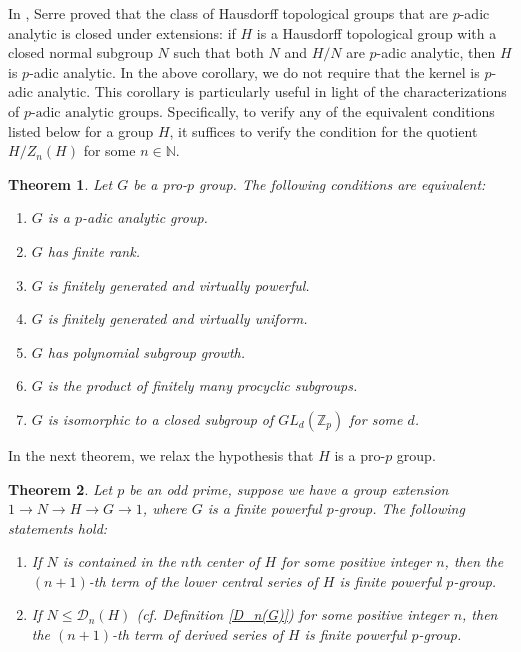 \documentclass[12pt]{elsarticle}
\makeatletter
\newtheorem{theorem}{Theorem}[section]
\newtheorem*{main corollary*}{Main Corollary}
\theoremstyle{definition}
\newcommand{\settheoremtag}[1]{%
  \let\oldthetheorem\thetheorem%
  \renewcommand{\thetheorem}{#1}%
  \g@addto@macro\endtheorem{%
    \global\let\thetheorem\oldthetheorem}%
  }
\makeatother
\begin{document}
In \cite[Theorem 3.4.5]{La1965}, Serre proved that the class of Hausdorff topological groups that are $p$-adic analytic is closed under extensions: if $H$ is a Hausdorff topological group with a closed normal subgroup $N$ such that both $N$ and $H/N$ are $p$-adic analytic, then $H$ is $p$-adic analytic. In the above corollary, we do not require that the kernel is $p$-adic analytic. This corollary is particularly useful in light of the characterizations of ${p\text{-adic analytic groups}}$. Specifically, to verify any of the equivalent conditions listed below for a group $H$, it suffices to verify the condition for the quotient $H/Z_n(H)$ for some $n \in \mathbb{N}$.

\settheoremtag{1.1}
\begin{theorem}\cite[Interlude A, 1]{DDMS99} \label{padic analytic characterization}
    Let $G$ be a pro-$p$ group. The following conditions are equivalent:
\begin{enumerate}
    \item [(i)] $G$ is a $p$-adic analytic group.
    \item [(ii)] $G$ has finite rank.
    \item [(iii)] $G$ is finitely generated and virtually powerful.
    \item [(iv)] $G$ is finitely generated and virtually uniform.
    \item [(v)] $G$ has polynomial subgroup growth.
    \item [(vi)] $G$ is the product of finitely many procyclic subgroups.
    \item [(vii)] $G$ is isomorphic to a closed subgroup of $GL_d(\mathbb{Z}_p)$ for some $d$.
\end{enumerate}
\end{theorem}


 

In the next theorem, we relax the hypothesis that $H$ is a pro-$p$ group.


\settheoremtag{B}
\begin{theorem} \label{MR: extension of powerful implies lower central and derived are powerful}
    Let $p$ be an odd prime, suppose we have a group extension $1\to N\to H \to G\to 1$, where $G$ is a finite powerful $p$-group. The following statements hold:
    
    \begin{enumerate}
        \item [(i)] If $N$ is contained in the $n$th center of $H$ for some positive integer $n$, then the $(n+1)$-th term of the lower central series of $H$ is finite powerful $p$-group.
       \item[(ii)] If $N\leqslant \mathcal{D}_n(H)$ (cf. Definition \ref{D_n(G)}) for some positive integer $n$, then the $(n+1)$-th term of derived series of $H$ is finite powerful $p$-group. 
    \end{enumerate}
\end{theorem}
\end{document}
